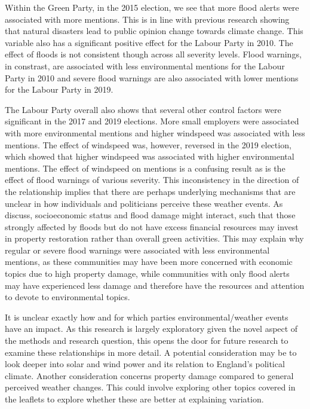 \documentclass[12pt,letterpaper]{article}
\begin{document}
Within the Green Party, in the 2015 election, we see that more flood alerts were associated with more mentions. This is in line with previous research showing that natural disasters lead to public opinion change towards climate change. This variable also has a significant positive effect for the Labour Party in 2010. The effect of floods is not consistent though across all severity levels. Flood warnings, in constrast, are associated with less environmental mentions for the Labour Party in 2010 and severe flood warnings are also associated with lower mentions for the Labour Party in 2019. 

The Labour Party overall also shows that several other control factors were significant in the 2017 and 2019 elections. More small employers were associated with more environmental mentions and higher windspeed was associated with less mentions. The effect of windspeed was, however, reversed in the 2019 election, which showed that higher windspeed was associated with higher environmental mentions. The effect of windspeed on mentions is a confusing result as is the effect of flood warnings of various severity. This inconsistency in the direction of the relationship implies that there are perhaps underlying mechanisms that are unclear in how individuals and politicians perceive these weather events. As \textcite{osberghausCausalEffectFlood2019} discuss, socioeconomic status and flood damage might interact, such that those strongly affected by floods but do not have excess financial resources may invest in property restoration rather than overall green activities. This may explain why regular or severe flood warnings were associated with less environmental mentions, as these communities may have been more concerned with economic topics due to high property damage, while communities with only flood alerts may have experienced less damage and therefore have the resources and attention to devote to environmental topics.

It is unclear  exactly how and for which parties environmental/weather events have an impact. As this research is largely exploratory given the novel aspect of the methods and research question, this opens the door for future research to examine these relationships in more detail. A potential consideration may be to look deeper into solar and wind power and its relation to England's political climate. Another consideration concerns property damage compared to general perceived weather changes. This could involve exploring other topics covered in the leaflets to explore whether these are better at explaining variation.
\end{document}
